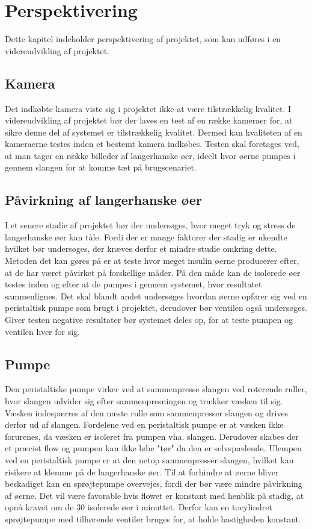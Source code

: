 \chapter{Perspektivering}
Dette kapitel indeholder perspektivering af projektet, som kan udføres i en videreudvikling af projektet.
\section{Kamera}
Det indkøbte kamera viste sig i projektet ikke at være  tilstrækkelig kvalitet. I videreudvikling af projektet bør der laves en test af en række kameraer for, at sikre denne del af systemet er tilstrækkelig kvalitet. Dermed kan kvaliteten af en kameraerne testes inden et bestemt kamera indkøbes. Testen skal foretages ved, at man tager en række billeder af langerhanske øer, ideelt hvor øerne pumpes i gennem slangen for at komme tæt på brugscenariet. 

\section{Påvirkning af langerhanske øer}
I et senere stadie af projektet bør der undersøges, hvor meget tryk og stress de langerhanske øer kan tåle. Fordi der er mange faktorer der stadig er ukendte hvilket bør undersøges, der kræves derfor et mindre studie omkring dette. Metoden det kan gøres på er at teste hvor meget insulin øerne producerer efter, at de har været påvirket på forskellige måder. På den måde kan de isolerede øer testes inden og efter at de pumpes i gennem systemet, hvor resultatet sammenlignes. Det skal blandt andet undersøges hvordan øerne opfører sig ved en peristaltisk pumpe som brugt i projektet, derudover bør ventilen også undersøges. Giver testen negative resultater bør systemet deles op, for at teste pumpen og ventilen hver for sig.

\section{Pumpe}
Den peristaltiske pumpe virker ved at sammenpresse slangen ved roterende ruller, hvor slangen udvider sig efter sammenpresningen og trækker væsken til sig. Væsken indespærres af den næste rulle som sammenpresser slangen og drives derfor ud af slangen. Fordelene ved en peristaltisk pumpe er at væsken ikke forurenes, da væsken er isoleret fra pumpen vha. slangen. Derudover skabes der et præcist flow og pumpen kan ikke løbe "tør" da den er selvspædende. Ulempen ved en peristaltisk pumpe er at den netop sammenpresser slangen, hvilket kan risikere at klemme på de langerhanske øer. Til at forhindre at øerne bliver beskadiget kan en sprøjtepumpe overvejes, fordi der bør være mindre påvirkning af øerne. Det vil være favorable hvis flowet er konstant med henblik på stadig, at opnå kravet om de 30 isolerede øer i minuttet. Derfor kan en tocylindret sprøjtepumpe med tilhørende ventiler bruges for, at holde hastigheden konstant. 

